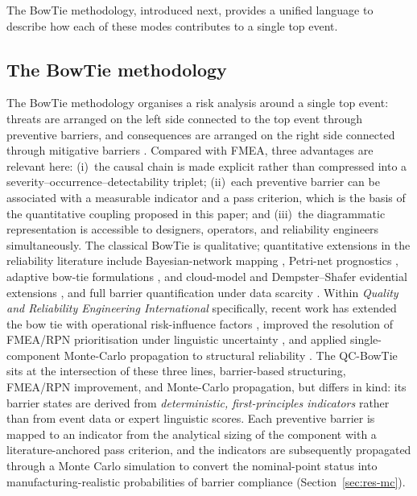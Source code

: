The BowTie methodology, introduced next, provides a unified language
to describe how each of these modes contributes to a single top event.

\subsection{The BowTie methodology}\label{sec:bg-bowtie}

The BowTie methodology organises a risk analysis around a single top
event: threats are arranged on the left side connected to the top
event through preventive barriers, and consequences are arranged on
the right side connected through mitigative barriers
\citep{deruijter2016bowtiereview}. Compared with FMEA, three
advantages are relevant here: (i)~the causal chain is made explicit
rather than compressed into a severity--occurrence--detectability
triplet; (ii)~each preventive barrier can be associated with a
measurable indicator and a pass criterion, which is the basis of the
quantitative coupling proposed in this paper; and (iii)~the
diagrammatic representation is accessible to designers, operators,
and reliability engineers simultaneously. The classical BowTie is
qualitative; quantitative extensions in the reliability literature
include Bayesian-network mapping
\citep{khakzad2012ress,khakzad2013bowtiebayesian}, Petri-net
prognostics \citep{vileiniskis2017ressbowtie}, adaptive
bow-tie formulations \citep{talebberrouane2021ressabt}, and
cloud-model and Dempster--Shafer evidential extensions
\citep{xie2021ressbowtie,sezer2023ressbowtie}, and full barrier
quantification under data scarcity
\citep{das2021comprehensive,wu2023novel}. Within
\emph{Quality and Reliability Engineering International} specifically,
recent work has extended the bow tie with operational
risk-influence factors \citep{hellas2025bobta}, improved the
resolution of FMEA/RPN prioritisation under linguistic uncertainty
\citep{tang2025pulfmea}, and applied single-component Monte-Carlo
propagation to structural reliability \citep{qian2023montecarlo}.
The QC-BowTie sits at the intersection of these three lines, barrier-based structuring, FMEA/RPN improvement, and Monte-Carlo
propagation, but differs in kind: its barrier states are derived
from \emph{deterministic, first-principles indicators} rather than
from event data or expert linguistic scores. Each preventive barrier
is mapped to an indicator from the analytical sizing of the component
with a literature-anchored pass criterion, and the indicators are
subsequently propagated through a Monte Carlo simulation to convert
the nominal-point status into manufacturing-realistic probabilities
of barrier compliance (Section~\ref{sec:res-mc}).

